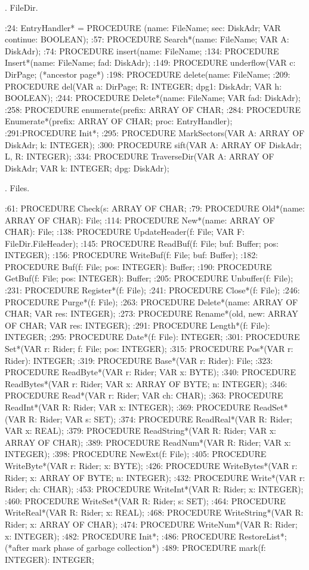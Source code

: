 . FileDir.

:24:    EntryHandler*   = PROCEDURE (name: FileName; sec: DiskAdr; VAR continue: BOOLEAN);
:57:  PROCEDURE Search*(name: FileName; VAR A: DiskAdr);
:74:  PROCEDURE insert(name: FileName;
:134:  PROCEDURE Insert*(name: FileName; fad: DiskAdr);
:149:  PROCEDURE underflow(VAR c: DirPage;  (*ancestor page*)
:198:  PROCEDURE delete(name: FileName;
:209:    PROCEDURE del(VAR a: DirPage; R: INTEGER; dpg1: DiskAdr; VAR h: BOOLEAN);
:244:  PROCEDURE Delete*(name: FileName; VAR fad: DiskAdr);
:258:  PROCEDURE enumerate(prefix:   ARRAY OF CHAR;
:284:  PROCEDURE Enumerate*(prefix: ARRAY OF CHAR; proc: EntryHandler);
:291:PROCEDURE Init*;
:295:    PROCEDURE MarkSectors(VAR A: ARRAY OF DiskAdr; k: INTEGER);
:300:      PROCEDURE sift(VAR A: ARRAY OF DiskAdr; L, R: INTEGER);
:334:    PROCEDURE TraverseDir(VAR A: ARRAY OF DiskAdr; VAR k: INTEGER; dpg: DiskAdr);

. Files.

:61:  PROCEDURE Check(s: ARRAY OF CHAR;
:79:  PROCEDURE Old*(name: ARRAY OF CHAR): File;
:114:  PROCEDURE New*(name: ARRAY OF CHAR): File;
:138:  PROCEDURE UpdateHeader(f: File; VAR F: FileDir.FileHeader);
:145:  PROCEDURE ReadBuf(f: File; buf: Buffer; pos: INTEGER);
:156:  PROCEDURE WriteBuf(f: File; buf: Buffer);
:182:  PROCEDURE Buf(f: File; pos: INTEGER): Buffer;
:190:  PROCEDURE GetBuf(f: File; pos: INTEGER): Buffer;
:205:  PROCEDURE Unbuffer(f: File);
:231:  PROCEDURE Register*(f: File);
:241:  PROCEDURE Close*(f: File);
:246:  PROCEDURE Purge*(f: File);
:263:  PROCEDURE Delete*(name: ARRAY OF CHAR; VAR res: INTEGER);
:273:  PROCEDURE Rename*(old, new: ARRAY OF CHAR; VAR res: INTEGER);
:291:  PROCEDURE Length*(f: File): INTEGER;
:295:  PROCEDURE Date*(f: File): INTEGER;
:301:  PROCEDURE Set*(VAR r: Rider; f: File; pos: INTEGER);
:315:  PROCEDURE Pos*(VAR r: Rider): INTEGER;
:319:  PROCEDURE Base*(VAR r: Rider): File;
:323:  PROCEDURE ReadByte*(VAR r: Rider; VAR x: BYTE);
:340:  PROCEDURE ReadBytes*(VAR r: Rider; VAR x: ARRAY OF BYTE; n: INTEGER);
:346:  PROCEDURE Read*(VAR r: Rider; VAR ch: CHAR);
:363:  PROCEDURE ReadInt*(VAR R: Rider; VAR x: INTEGER);
:369:  PROCEDURE ReadSet*(VAR R: Rider; VAR s: SET);
:374:  PROCEDURE ReadReal*(VAR R: Rider; VAR x: REAL);
:379:  PROCEDURE ReadString*(VAR R: Rider; VAR x: ARRAY OF CHAR);
:389:  PROCEDURE ReadNum*(VAR R: Rider; VAR x: INTEGER);
:398:  PROCEDURE NewExt(f: File);
:405:  PROCEDURE WriteByte*(VAR r: Rider; x: BYTE);
:426:  PROCEDURE WriteBytes*(VAR r: Rider; x: ARRAY OF BYTE; n: INTEGER);
:432:  PROCEDURE Write*(VAR r: Rider; ch: CHAR);
:453:  PROCEDURE WriteInt*(VAR R: Rider; x: INTEGER);
:460:  PROCEDURE WriteSet*(VAR R: Rider; s: SET);
:464:  PROCEDURE WriteReal*(VAR R: Rider; x: REAL);
:468:  PROCEDURE WriteString*(VAR R: Rider; x: ARRAY OF CHAR);
:474:  PROCEDURE WriteNum*(VAR R: Rider; x: INTEGER);
:482:  PROCEDURE Init*;
:486:  PROCEDURE RestoreList*; (*after mark phase of garbage collection*)
:489:    PROCEDURE mark(f: INTEGER): INTEGER;

